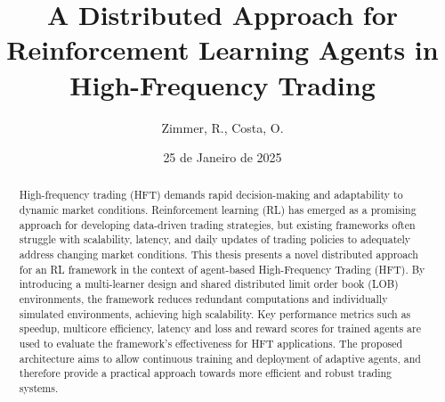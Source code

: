 \title{A Distributed Approach for Reinforcement Learning Agents in High-Frequency Trading}
\author{Zimmer, R., Costa, O.}
\date{25 de Janeiro de 2025}

\setlength{\droptitle}{-2cm}
\maketitle
\begin{abstract}
  High-frequency trading (HFT) demands rapid decision-making and adaptability to dynamic market conditions. 
  Reinforcement learning (RL) has emerged as a promising approach for developing data-driven trading strategies, 
  but existing frameworks often struggle with scalability, latency, and daily updates of trading policies to adequately address changing market conditions.
  This thesis presents a novel distributed approach for an RL framework in the context of agent-based High-Frequency Trading (HFT).
  By introducing a multi-learner design and shared distributed limit order book (LOB) environments, 
  the framework reduces redundant computations and individually simulated environments, achieving high scalability. 
  Key performance metrics such as speedup, multicore efficiency, latency
  and loss and reward scores for trained agents are used to evaluate the framework's effectiveness for HFT applications.
  The proposed architecture aims to allow continuous training and deployment of adaptive agents, 
  and therefore provide a practical approach towards more efficient and robust trading systems.
\end{abstract}


